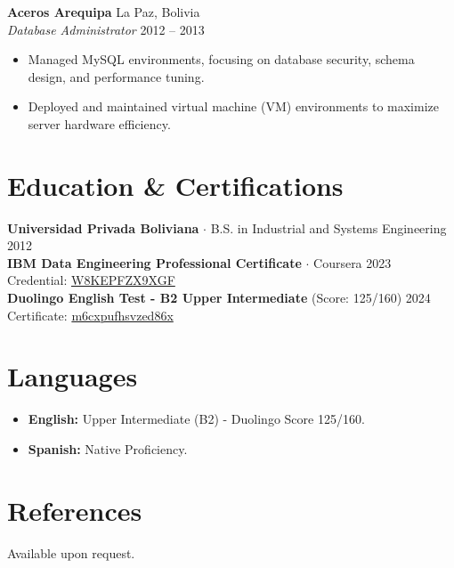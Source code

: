 \documentclass[11pt,a4paper,sans]{article}
\begin{document}
\vspace{6pt}

\textbf{Aceros Arequipa} \hfill La Paz, Bolivia \\
\textit{Database Administrator} \hfill 2012 -- 2013
\begin{itemize}
    \item Managed MySQL environments, focusing on database security, schema design, and performance tuning.
    \item Deployed and maintained virtual machine (VM) environments to maximize server hardware efficiency.
\end{itemize}

\section{Education \& Certifications}
\textbf{Universidad Privada Boliviana} $\cdot$ B.S. in Industrial and Systems Engineering \hfill 2012 \\
\textbf{IBM Data Engineering Professional Certificate} $\cdot$ Coursera \hfill 2023 \\
Credential: \href{https://www.coursera.org/account/accomplishments/specialization/W8KEPFZX9XGF}{W8KEPFZX9XGF} \\
\textbf{Duolingo English Test - B2 Upper Intermediate} (Score: 125/160) \hfill 2024 \\
Certificate: \href{https://certs.duolingo.com/m6cxpufhsvzed86x}{m6cxpufhsvzed86x}

\section{Languages}
\begin{itemize}
    \item \textbf{English:} Upper Intermediate (B2) - Duolingo Score 125/160.
    \item \textbf{Spanish:} Native Proficiency.
\end{itemize}

\section{References}
Available upon request.
\end{document}
